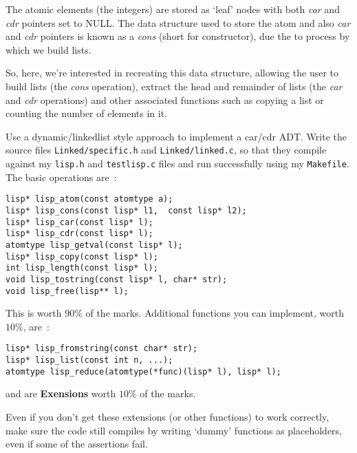\noindent The atomic elements (the integers) are stored as `leaf' nodes with both {\it car} and {\it cdr}
pointers set to NULL. The data structure used to store the atom and also {\it car} and {\it cdr} pointers
is known as a {\it cons} (short for constructor), due the to process by which we build lists.

So, here, we're interested in recreating this data structure, allowing the user to build lists (the
{\it cons} operation), extract the head and remainder of lists (the {\it car} and {\it cdr} operations)
and other associated functions such as copying a list or counting the number of elements in it.

\begin{exercise}
Use a dynamic/linkedlist style approach to implement a car/cdr ADT. Write the source files
\verb^Linked/specific.h^ and \verb^Linked/linked.c^, so that they compile against my
\verb^lisp.h^ and \verb^testlisp.c^ files and run successfully using my \verb^Makefile^.
The basic operations are~:
\begin{verbatim}
lisp* lisp_atom(const atomtype a);
lisp* lisp_cons(const lisp* l1,  const lisp* l2);
lisp* lisp_car(const lisp* l);
lisp* lisp_cdr(const lisp* l);
atomtype lisp_getval(const lisp* l);
lisp* lisp_copy(const lisp* l);
int lisp_length(const lisp* l);
void lisp_tostring(const lisp* l, char* str);
void lisp_free(lisp** l);
\end{verbatim}

\noindent This is worth $90\%$ of the marks.
Additional functions you can implement, worth $10\%$, are~:
\begin{verbatim}
lisp* lisp_fromstring(const char* str);
lisp* lisp_list(const int n, ...);
atomtype lisp_reduce(atomtype(*func)(lisp* l), lisp* l);
\end{verbatim}
and are {\bf Exensions} worth $10\%$ of the marks.

\noindent Even if you don't get these extensions (or other functions) to work correctly, make
sure the code still compiles by writing `dummy' functions as placeholders,
even if some of the assertions fail.
\end{exercise}
